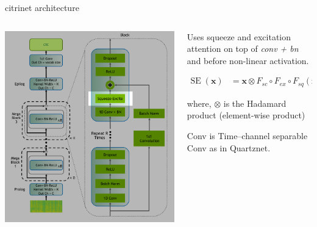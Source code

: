 \documentclass[aspectratio=169,xcolor={dvipsnames,svgnames}]{beamer}
\begin{document}
\begin{frame}[label={sec:org683768e}]{citrinet architecture}
\begin{columns}
\begin{column}{0.45\columnwidth}
{\begin{center}
\includegraphics[width=.9\linewidth]{org-download-images/citrinet/2024-11-19_09-37-34_screenshot.png}
\end{center}

}
\end{column}

\begin{column}{.55\columnwidth}
Uses \alert{squeeze and excitation} attention on top of
\emph{conv + bn} and before non-linear activation.

\begin{align*}
  \mathrm{SE}\;(\mathbf{x})
  &= \mathbf{x} \otimes F_{sc}\circ F_{ex}\circ F_{sq}
    (\mathbf{x}) 
\end{align*}

where, \(\otimes\) is the Hadamard product (element-wise
product)

\alert{Conv} is Time–channel separable Conv as in Quartznet.
\end{column}
\end{columns}
\end{frame}
\end{document}
